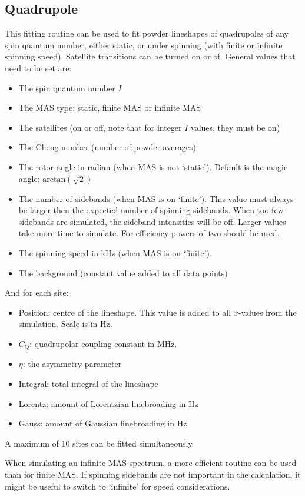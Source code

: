 \documentclass[11pt,a4paper]{article}
\begin{document}
\subsection{Quadrupole}
This fitting routine can be used to fit powder lineshapes of quadrupoles of any spin quantum number,
either static, or under spinning (with finite or infinite spinning speed). Satellite transitions can
be turned on or of. General values that need to be set are:
\begin{itemize}
\item The spin quantum number $I$ 
\item The MAS type: static, finite MAS or infinite MAS
\item The satellites (on or off, note that for integer $I$ values, they must be on)
\item The Cheng number (number of powder averages)
\item The rotor angle in radian (when MAS is not `static'). Default is the magic angle:
	 $\text{arctan}(\sqrt{2})$
\item The number of sidebands (when MAS is on `finite'). This value must always be larger then the
  expected number of spinning sidebands. When too few sidebands are simulated, the sideband intensities will be off. Larger values take more time to simulate. For efficiency powers of two should be used.
\item The spinning speed in kHz (when MAS is on `finite').
\item The background (constant value added to all data points)
\end{itemize}
And for each site:
\begin{itemize}
\item Position: centre of the lineshape. This value is added to all $x$-values from the simulation. Scale is in Hz.
\item $C_\text{Q}$: quadrupolar coupling constant in MHz.
\item $\eta$: the asymmetry parameter
\item Integral: total integral of the lineshape
\item Lorentz: amount of Lorentzian linebroading in Hz
\item Gauss: amount of Gaussian linebroading in Hz.
\end{itemize}
A maximum of 10 sites can be fitted simultaneously.

When simulating an infinite MAS spectrum, a more efficient routine can be used than for finite MAS.
If spinning sidebands are not important in the calculation, it might be useful to switch to
`infinite' for speed considerations.
\end{document}
